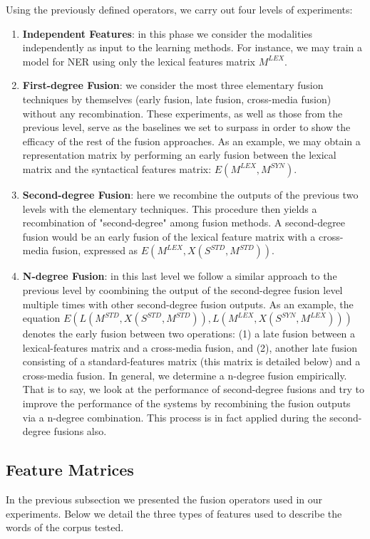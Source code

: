 \documentclass[11pt]{article}
\begin{document}
Using the previously defined operators, we carry out four levels of experiments: 
\begin{enumerate}
\item \textbf{Independent Features}: in this phase we consider the modalities independently as input to the learning methods. For instance, we may train a model for NER using only the lexical features matrix $M^{LEX}$.
\item \textbf{First-degree Fusion}: we  consider the most three elementary fusion techniques by themselves (early fusion, late fusion, cross-media fusion) without any recombination.  These experiments, as well as those from the previous level, serve as the baselines we set to surpass in order to show the efficacy of the rest of the fusion approaches.
As an example, we may obtain a representation matrix by performing an early fusion between the lexical matrix and the syntactical features matrix: $E(M^{LEX}, M^{SYN})$.
\item \textbf{Second-degree Fusion}: here we recombine the outputs of the previous two levels with the elementary techniques. This procedure then yields a recombination of "second-degree" among fusion methods. A second-degree fusion would be an early fusion of the lexical feature matrix with a cross-media fusion, expressed as $E(M^{LEX}, X(S^{STD}, M^{STD}))$.   
\item \textbf{N-degree Fusion}: in this last level we follow a similar approach to the previous level by coombining the output of the second-degree fusion level multiple times with other second-degree fusion outputs. As an example, the equation $E(L(M^{STD}, X(S^{STD}, M^{STD})), \allowbreak L(M^{LEX}, X(S^{SYN}, M^{LEX})))$  denotes the early fusion between two operations: (1) a late fusion between a lexical-features matrix and a cross-media fusion, and (2),  another late fusion consisting of a standard-features matrix (this matrix is detailed below)  and a cross-media fusion. In general, we determine a n-degree fusion empirically. That is to say, we look at the performance of second-degree fusions and try to improve the performance of the systems by recombining the fusion outputs via a n-degree combination. This process is in fact applied during the second-degree fusions also. 
\end{enumerate}   
\subsection{Feature Matrices}
In the previous subsection we presented the fusion operators used in our experiments. Below we detail the three types of features used to describe the words of the corpus tested.
\end{document}
